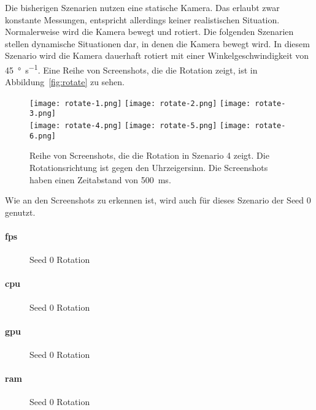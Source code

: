 Die bisherigen Szenarien nutzen eine statische Kamera. Das erlaubt zwar konstante Messungen, entspricht allerdings keiner realistischen Situation. Normalerweise wird die Kamera bewegt und rotiert. Die folgenden Szenarien stellen dynamische Situationen dar, in denen die Kamera bewegt wird. In diesem Szenario wird die Kamera dauerhaft rotiert mit einer Winkelgeschwindigkeit von \SI{45}{\degree\per\second}. Eine Reihe von Screenshots, die die Rotation zeigt, ist in Abbildung~\vref{fig:rotate} zu sehen.
\begin{figure}
	\centering
	\texttt{[image: rotate-1.png]}
	\texttt{[image: rotate-2.png]}
	\texttt{[image: rotate-3.png]}\\[4pt]
	\texttt{[image: rotate-4.png]}
	\texttt{[image: rotate-5.png]}
	\texttt{[image: rotate-6.png]}
	\caption{Reihe von Screenshots, die die Rotation in Szenario 4 zeigt. Die Rotationsrichtung ist gegen den Uhrzeigersinn. Die Screenshots haben einen Zeitabstand von \SI{500}{\milli\second}.}\label{fig:rotate}
\end{figure}
Wie an den Screenshots zu erkennen ist, wird auch für dieses Szenario der Seed 0 genutzt.

\paragraph{\ac{fps}}
\begin{figure}[!htbp]
	\caption{Seed 0 Rotation}\label{fig:seed-0-rotate-fps}
\end{figure}

\paragraph{\ac{cpu}}
\begin{figure}[!htbp]
	\caption{Seed 0 Rotation}\label{fig:seed-0-rotate-cpu}
\end{figure}

\paragraph{\ac{gpu}}
\begin{figure}[!htbp]
	\caption{Seed 0 Rotation}\label{fig:seed-0-rotate-gpu}
\end{figure}

\paragraph{\ac{ram}}
\begin{figure}[!htbp]
	\caption{Seed 0 Rotation}\label{fig:seed-0-rotate-mem}	
\end{figure} 

